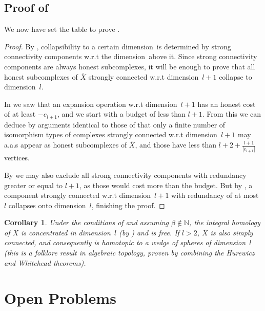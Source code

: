 \documentclass{article}
\theoremstyle{plain}
\newtheorem{corollary}[theorem]{Corollary}
\theoremstyle{definition}
\theoremstyle{remark}
\newcommand{\N}{\mathbb{N}}
\newcommand{\di}{dimension}
\begin{document}
\subsection{Proof of }
We now have set the table to prove .
\begin{proof}
    By , collapsibility to a certain \di \ is determined by strong connectivity components w.r.t the \di\ above it. Since strong connectivity components are always honest subcomplexes, it will be enough to prove that all honest subcomplexes of $\overline{X}$ strongly connected w.r.t \di \ $l+1$ collapse to \di \ $l$.

    In  we saw that an expansion operation w.r.t \di \ $l+1$ has an honest cost of at least $-e_{l+1}$, and we start with a budget of less than $l+1$. 
    From this we can deduce by arguments identical to those of  that only a finite number of isomorphism types of complexes strongly connected w.r.t \di \ $l+1$ may a.a.s appear as honest subcomplexes of $\overline{X}$, and those have less than $l+2+\frac{l+1}{|e_{l+1}|}$ vertices.\par
     By  we may also exclude all strong connectivity components with redundancy greater or equal to $l+1$, as those would cost more than the budget.
    But by , a component strongly connected w.r.t \di \ $l+1$ with redundancy of at most $l$ collapses onto \di \ $l$, finishing the proof.     
\end{proof}

\begin{corollary}\label{cor:wedgeSpheres}
    Under the conditions of  and assuming $\beta\not \in \N$, the integral homology of $\overline{X}$ is concentrated in \di\ $l$ (by ) and is free.
    If $l>2$, $\overline{X}$ is also simply connected, and consequently
    is homotopic to a wedge of spheres of \di\ $l$ (this is a folklore result in algebraic topology, proven by combining the Hurewicz and Whitehead theorems). 
\end{corollary}

\section{Open Problems}\label{discus}
\end{document}
